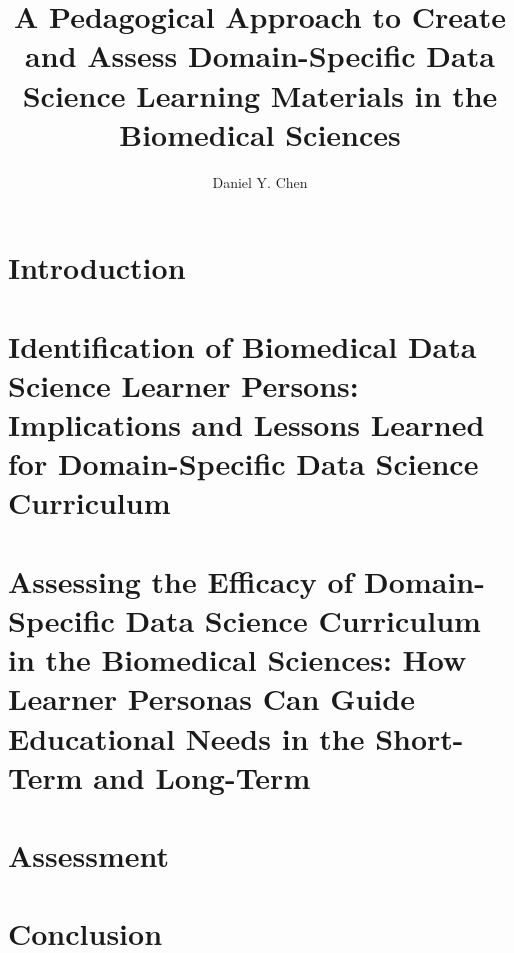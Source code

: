 \documentclass[doublespace,draft,nopageskip]{VTthesis} %
\title{A Pedagogical Approach
       to Create and Assess
       Domain-Specific
       Data Science Learning Materials
       in the Biomedical Sciences}
\author{Daniel Y. Chen}
\begin{document}
  \frontmatter
  \maketitle
  \tableofcontents

	\listoffigures
	\listoftables
    \printnomenclature %
    

	\mainmatter

	\chapter{Introduction} \label{ch:introduction}
        

    \chapter{Identification of Biomedical Data Science Learner Persons:
             Implications and Lessons Learned for Domain-Specific Data Science Curriculum}
        \label{ch:persona_validation}
        

    \chapter{Assessing the Efficacy of Domain-Specific Data Science Curriculum in the Biomedical Sciences:
             How Learner Personas Can Guide Educational Needs in the Short-Term and Long-Term}
        \label{ch:workshop}
        

    \chapter{Assessment} \label{ch:assessment}
        

    \chapter{Conclusion} \label{ch:conclusion}
\end{document}
